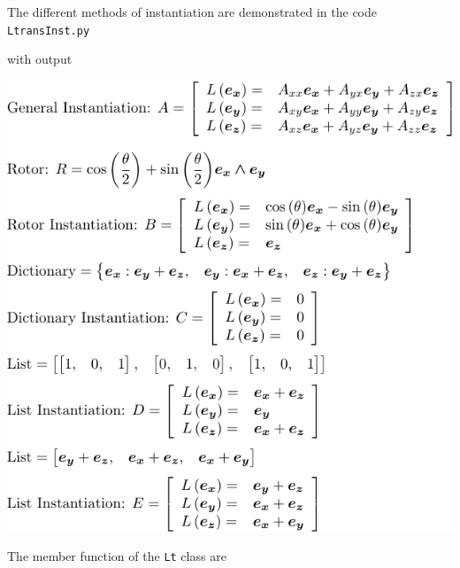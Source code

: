 \documentclass[12pt]{report}
\newcommand{\T}[1]{\texttt{#1}}
\newcommand{\includecode}[1]{}
\begin{document}
The different methods of instantiation are demonstrated in the code \T{LtransInst.py}
\includecode{python/LtransInst.py}
with output
\begin{center}
    \includegraphics[scale=1]{python/LtransInst.pdf}
\end{center}
The member function of the \T{Lt} class are
\end{document}
